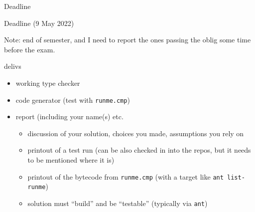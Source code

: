 \documentclass{beamer}
\begin{document}
\begin{frame}[label={sec:org3812f8a},fragile]{Deadline}
 \begin{alertblock}{Deadline}
(9 May 2022)
\end{alertblock}


Note: end of semester, and I need to report the ones passing the oblig some
time before the exam.


\begin{block}{delivs}
\begin{itemize}
\item working type checker
\item code generator (test with \texttt{runme.cmp})
\item report (including your name(s) etc.

\begin{itemize}
\item discussion of your solution, choices you made, assumptions you rely on

\item printout of a test run (can be also checked in into the repos, but it 
needs to be mentioned where it is)
\item printout of the bytecode from \texttt{runme.cmp} (with a target like \texttt{ant
    list-runme})

\item solution must ``build'' and be ``testable'' (typically via \texttt{ant})
\end{itemize}
\end{itemize}
\end{block}
\end{frame}
\end{document}
